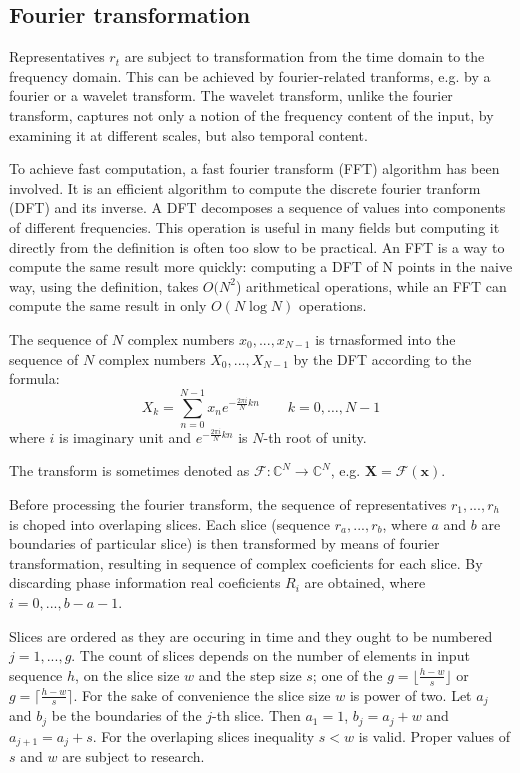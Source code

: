 
\subsection{Fourier transformation}
Representatives $r_t$ are subject to transformation from the time domain to the
frequency domain.
This can be achieved by fourier-related
tranforms, e.g. by a fourier or a wavelet transform.
The wavelet transform, unlike the fourier transform, captures
not only a notion of the frequency content of the input, by
examining it at different scales, but also temporal content.

To achieve fast computation, a fast fourier transform (FFT) algorithm 
has been involved.
It is an efficient algorithm to compute the discrete fourier tranform (DFT) and
its inverse.
A DFT decomposes a sequence of values into components of
different frequencies. 
This operation is useful in many fields but computing it directly from the
definition is often too slow to be practical.
An FFT is a way to compute the same result more quickly: 
computing a DFT of N points in the naive way, using the definition, takes
$O(N^2$) arithmetical operations, 
while an FFT can compute the same result in only $ O(N \log N)$ operations.

The sequence of $N$ complex numbers $x_0, ...,x_{N-1}$ is trnasformed into the 
sequence of $N$ complex numbers $X_0, ...,X_{N-1}$ by the DFT according to the formula:
\begin{equation}
X_k = \sum_{n=0}^{N-1} x_n e^{-\frac{2 \pi i}{N} k n} \quad \quad k = 0, \dots, N-1
\end{equation}
where $i$ is imaginary unit and $e^{-\frac{2 \pi i}{N} k n}$ is $N$-th root of
unity. 

The transform is sometimes denoted as 
$\mathcal{F}\colon\mathbb{C}^N \to \mathbb{C}^N$, e.g.
$\mathbf{X} = \mathcal{F} \left ( \mathbf{x} \right )$.

Before processing the fourier transform, the sequence of representatives 
$r_1, ...,r_h$ is choped into overlaping slices.
Each slice (sequence $r_a, ..., r_b$, where $a$ and $b$ are boundaries
of particular slice) is then transformed by means of fourier transformation,
resulting in sequence of complex coeficients for each slice.
By discarding phase information real coeficients ${R}_i$ are obtained,
where $i = 0, ..., b-a-1$.

Slices are ordered as they are occuring in time and they ought to be numbered
$j = 1,..., g $. The count of slices  depends on the number of elements 
in input sequence $h$, on the slice size $w$ and the step size $s$; one of the
$g=\lfloor\frac{h-w}{s} \rfloor$ or $g=\lceil\frac{h-w}{s} \rceil$.
For the sake of convenience the slice size $w$ is power of two.
Let $a_j$ and $b_j$ be the boundaries of the $j$-th slice. Then
$a_1 = 1$, $b_j = a_j + w$ and $a_{j+1} = a_j + s$.
For the overlaping slices inequality $s < w$ is valid.
Proper values of $s$ and $w$ are subject to research.

